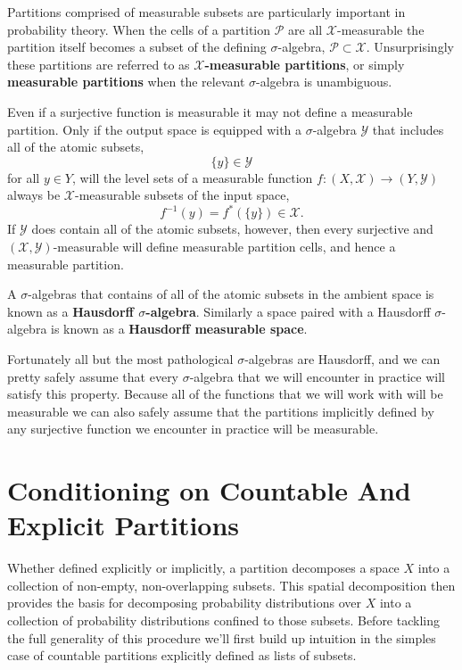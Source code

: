 \documentclass[
  letterpaper,
  DIV=11,
  numbers=noendperiod]{scrartcl}
\begin{document}
Partitions comprised of measurable subsets are particularly important in
probability theory. When the cells of a partition \(\mathcal{P}\) are
all \(\mathcal{X}\)-measurable the partition itself becomes a subset of
the defining \(\sigma\)-algebra, \(\mathcal{P} \subset \mathcal{X}\).
Unsurprisingly these partitions are referred to as
\textbf{\(\mathcal{X}\)-measurable partitions}, or simply
\textbf{measurable partitions} when the relevant \(\sigma\)-algebra is
unambiguous.

Even if a surjective function is measurable it may not define a
measurable partition. Only if the output space is equipped with a
\(\sigma\)-algebra \(\mathcal{Y}\) that includes all of the atomic
subsets, \[
\{ y \} \in \mathcal{Y}
\] for all \(y \in Y\), will the level sets of a measurable function
\(f : (X, \mathcal{X}) \rightarrow (Y, \mathcal{Y})\) always be
\(\mathcal{X}\)-measurable subsets of the input space, \[
f^{-1}( y ) = f^{*}( \{ y \} ) \in \mathcal{X}.
\] If \(\mathcal{Y}\) does contain all of the atomic subsets, however,
then every surjective and \((\mathcal{X}, \mathcal{Y})\)-measurable will
define measurable partition cells, and hence a measurable partition.

A \(\sigma\)-algebras that contains of all of the atomic subsets in the
ambient space is known as a \textbf{Hausdorff \(\sigma\)-algebra}.
Similarly a space paired with a Hausdorff \(\sigma\)-algebra is known as
a \textbf{Hausdorff measurable space}.

Fortunately all but the most pathological \(\sigma\)-algebras are
Hausdorff, and we can pretty safely assume that every \(\sigma\)-algebra
that we will encounter in practice will satisfy this property. Because
all of the functions that we will work with will be measurable we can
also safely assume that the partitions implicitly defined by any
surjective function we encounter in practice will be measurable.

\section{Conditioning on Countable And Explicit
Partitions}\label{sec:explicit-conditional}

Whether defined explicitly or implicitly, a partition decomposes a space
\(X\) into a collection of non-empty, non-overlapping subsets. This
spatial decomposition then provides the basis for decomposing
probability distributions over \(X\) into a collection of probability
distributions confined to those subsets. Before tackling the full
generality of this procedure we'll first build up intuition in the
simples case of countable partitions explicitly defined as lists of
subsets.
\end{document}
